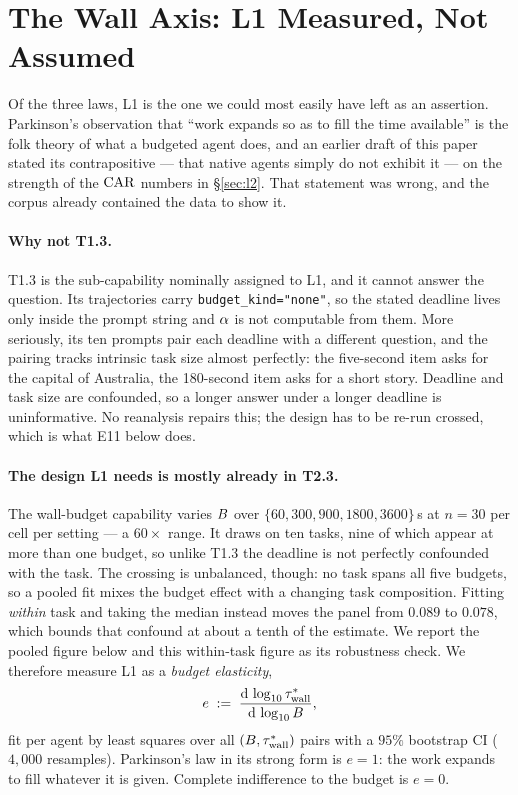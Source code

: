 
\section{The Wall Axis: L1 Measured, Not Assumed}
\label{sec:l1}

Of the three laws, L1 is the one we could most easily have left as an
assertion. Parkinson's observation that ``work expands so as to fill the time
available'' \citep{parkinson1955} is the folk theory of what a budgeted agent
does, and an earlier draft of this paper stated its contrapositive --- that
native agents simply do not exhibit it --- on the strength of the $\mathrm{CAR}$
numbers in \S\ref{sec:l2}. That statement was wrong, and the corpus already
contained the data to show it.

\paragraph{Why not T1.3.} T1.3 is the sub-capability nominally assigned to
L1, and it cannot answer the question. Its trajectories carry
\texttt{budget\_kind="none"}, so the stated deadline lives only inside the
prompt string and $\alpha$ is not computable from them. More seriously,
its ten prompts pair each deadline with a different question, and the pairing
tracks intrinsic task size almost perfectly: the five-second item asks for the
capital of Australia, the 180-second item asks for a short story. Deadline and
task size are confounded, so a longer answer under a longer deadline is
uninformative. No reanalysis repairs this; the design has to be re-run
crossed, which is what E11 below does.

\paragraph{The design L1 needs is mostly already in T2.3.} The wall-budget
capability varies $B$ over $\{60, 300, 900, 1800, 3600\}$\,s at $n = 30$
per cell per setting --- a $60\times$ range. It draws on ten tasks, nine of
which appear at more than one budget, so unlike T1.3 the deadline is not
perfectly confounded with the task. The crossing is unbalanced, though: no task
spans all five budgets, so a pooled fit mixes the budget effect with a changing
task composition. Fitting \emph{within} task and taking the median instead
moves the panel from $0.089$ to $0.078$, which bounds that confound at about a
tenth of the estimate. We report the pooled figure below and this within-task
figure as its robustness check. We therefore measure L1 as a \emph{budget
elasticity},
\[
  e \;:=\; \frac{\mathrm{d}\,\log_{10} \tau_{\mathrm{wall}}^{*}}{\mathrm{d}\,\log_{10} B},
\]
fit per agent by least squares over all $(B, \tau_{\mathrm{wall}}^{*})$ pairs with a
$95\%$ bootstrap CI ($4{,}000$ resamples). Parkinson's law in its strong form
is $e = 1$: the work expands to fill whatever it is given. Complete
indifference to the budget is $e = 0$.


